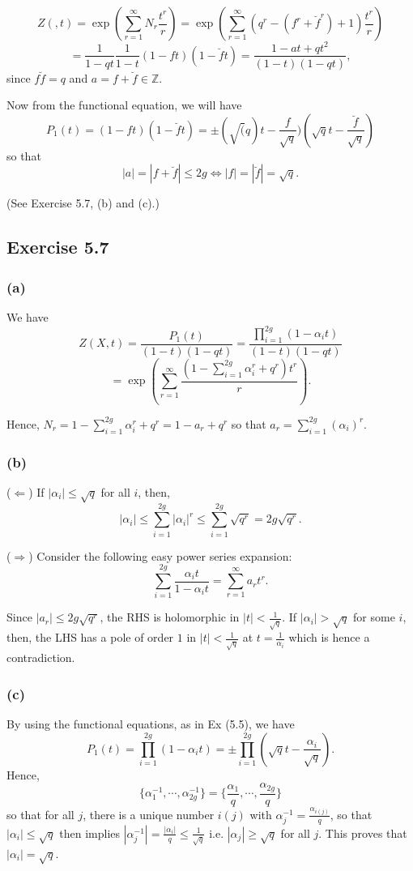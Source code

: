\documentclass[11pt]{amsart}          %
\newcommand{\bbZ}{\mathbb{Z}}
\begin{document}
$$Z(,t) = \exp (\sum_{r=1} ^{\infty} N_r \frac{t^r}{r}) = \exp (\sum_{r=1} ^{\infty} (q^r - (f^r + \breve{f} ^r) + 1) \frac{t^r}{r})$$
$$ = \frac{1}{1-qt} \frac{1}{1-t} (1-ft)(1-\breve{f}t)= \frac{1-at+qt^2}{(1-t)(1-qt)},$$ since $f \breve{f} = q$ and $a = f + \breve{f} \in \bbZ$.

Now from the functional equation, we will have
$$P_1 (t) = (1-ft) (1-\breve{f}t) = \pm (\sqrt(q)t - \frac{f}{\sqrt{q}}) (\sqrt{q} t - \frac{\breve{f}}{\sqrt{q}})$$ so that
$$|a| = |f + \breve{f}| \leq 2g \Leftrightarrow |f| = |\breve{f}| = \sqrt{q}.$$

(See Exercise 5.7, (b) and (c).)

\subsection*{Exercise 5.7} \subsubsection*{(a)} We have
$$Z(X,t) = \frac{P_1(t)}{(1-t)(1-qt)} = \frac{ \prod_{i=1} ^{2g} (1-\alpha_it)}{(1-t)(1-qt)}$$ $$= \exp (\sum_{r=1} ^{\infty} \frac{ (1- \sum_{i=1} ^{2g} \alpha_i ^r + q^r) t^r}{ r} ).$$

Hence, $N_r = 1 - \sum_{i=1} ^{2g} \alpha_i ^r + q^r = 1 - a_r + q^r$ so that $a_r = \sum_{i=1} ^{2g} (\alpha_i)^r$.

\subsubsection*{(b)}($\Leftarrow$) If $|\alpha_i| \leq \sqrt{q}$ for all $i$, then,
$$|\alpha_i| \leq \sum_{i=1} ^{2g} | \alpha_i | ^r \leq \sum_{i=1} ^{2g} \sqrt{q^r} = 2g \sqrt{q^r}.$$

\noindent ($\Rightarrow$) Consider the following easy power series expansion:
$$\sum_{i=1} ^{2g} \frac{\alpha_i t}{1- \alpha_i t} = \sum_{r=1} ^{\infty} a_r t^r.$$

Since $|a_r | \leq 2g \sqrt{q^r}$, the RHS is holomorphic in $|t|<\frac{1}{\sqrt{q}}$. If $|\alpha_i | > \sqrt{q}$ for some $i$, then, the LHS has a pole of order $1$ in $|t| < \frac{1}{\sqrt{q}}$ at $t = \frac{1}{\alpha_i}$ which is hence a contradiction.

\subsubsection*{(c)} By using the functional equations, as in Ex (5.5), we have $$P_1 (t) = \prod_{i=1} ^{2g} (1-\alpha_i t) = \pm \prod_{i=1} ^{2g} (\sqrt{q} t - \frac{\alpha_i}{\sqrt{q}}).$$ Hence, 
$$\{ \alpha_1 ^{-1} , \cdots, \alpha_{2g} ^{-1} \} = \{ \frac{\alpha_1}{q} , \cdots, \frac{\alpha_{2g}}{q} \}$$ so that for all $j$, there is a unique number $i(j)$ with $\alpha_j ^{-1} = \frac{\alpha_{i(j)}}{q}$, so that $|\alpha_i| \leq \sqrt{q}$ then implies $|\alpha_j ^{-1}| = \frac{|\alpha_i|}{q} \leq \frac{1}{\sqrt{q}}$ i.e. $|\alpha_j | \geq \sqrt{q}$ for all $j$. This proves that $|\alpha _i | = \sqrt{q}$.
\end{document}
